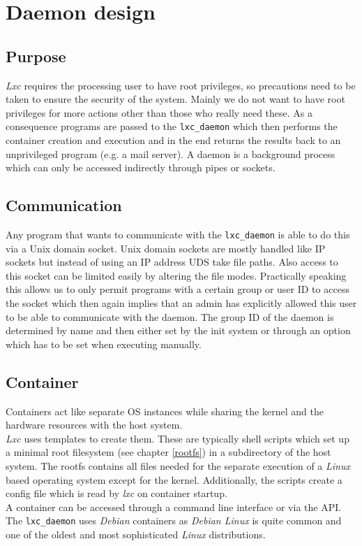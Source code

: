 \chapter{Daemon design}

\section{Purpose}

\textit{Lxc} requires the processing user to have root privileges, so precautions need to be taken to ensure
the security of the system. Mainly we do not want to have root privileges for more actions other than those who really
need these. As a consequence programs are passed to the \texttt{lxc\_daemon} which then performs the container creation
and execution and in the end returns the results back to an unprivileged program (e.g. a mail server).
A daemon is a background process which can only be accessed indirectly through pipes or sockets.

\section{Communication}

Any program that wants to communicate with the \texttt{lxc\_daemon} is able to do this via a Unix domain socket.
Unix domain sockets are mostly handled like IP sockets but instead of using an IP address UDS take file paths.
Also access to this socket can be limited easily by altering the file modes.
Practically speaking this allows us to only permit programs with a certain group or user ID to access the socket which then again
implies that an admin has explicitly allowed this user to be able to communicate with the daemon.
The group ID of the daemon is determined by name and then either set by the init system or through an option which has to be set
when executing manually.

\section{Container}

Containers act like separate OS instances while sharing the kernel and the hardware resources with the host system.\\
\textit{Lxc} uses templates to create them. These are typically shell scripts which set up a minimal root
filesystem (see chapter \ref{rootfs}) in a subdirectory of the host system.
The rootfs contains all files needed for the separate execution of a \textit{Linux} based operating system except for the kernel.
Additionally, the scripts create a config file which is read by \textit{lxc} on container startup.\\
A container can be accessed through a command line interface or via the API.
The \texttt{lxc\_daemon} uses \textit{Debian} containers as \textit{Debian Linux}\cite{debian} is quite common and one of
the oldest and most sophisticated \textit{Linux} distributions.

